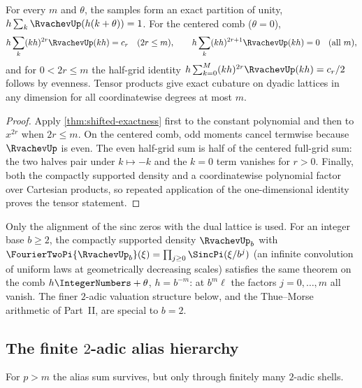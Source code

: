 \begin{corollary}
\label{cor:up-exact-specials}
For every $m$ and $\theta$, the samples form an exact partition of
unity, $h\sum_k\RvachevUp(h(k+\theta))=1$.  For the centered comb
($\theta=0$),
\begin{equation}
 h\sum_{k}(kh)^{2r}\RvachevUp(kh)=c_r\quad(2r\le m),
 \qquad
 h\sum_{k}(kh)^{2r+1}\RvachevUp(kh)=0\quad(\text{all }m),
 \label{eq:centered-moments}
\end{equation}
and for $0<2r\le m$ the half-grid identity
$h\sum_{k=0}^{M}(kh)^{2r}\RvachevUp(kh)=c_r/2$ follows by evenness.
Tensor products give exact cubature on dyadic lattices in any
dimension for all coordinatewise degrees at most $m$.
\end{corollary}

\begin{proof}
Apply \cref{thm:shifted-exactness} first to the constant polynomial and
then to $x^{2r}$ when $2r\le m$.  On the centered comb, odd moments
cancel termwise because $\RvachevUp$ is even.  The even half-grid sum is
half of the centered full-grid sum: the two halves pair under $k\mapsto-k$
and the $k=0$ term vanishes for $r>0$.  Finally, both the compactly
supported density and a coordinatewise polynomial factor over Cartesian
products, so repeated application of the one-dimensional identity proves
the tensor statement.
\end{proof}

\begin{remark}
\label{rem:base-b}
Only the alignment of the sinc zeros with the dual lattice is used.
For an integer base $b\ge2$, the compactly supported density $\RvachevUp_b$
with $\FourierTwoPi{\RvachevUp_b}(\xi)=\prod_{j\ge0}\SincPi(\xi/b^{j})$ (an
infinite convolution of uniform laws at geometrically decreasing
scales) satisfies the same theorem on the comb $h\IntegerNumbers+\theta$,
$h=b^{-m}$: at $b^{m}\ell$ the factors $j=0,\dots,m$ all vanish.  The
finer $2$-adic valuation structure below, and the Thue--Morse
arithmetic of Part~II, are special to $b=2$.
\end{remark}

\subsection{The finite \texorpdfstring{$2$}{2}-adic alias hierarchy}

For $p>m$ the alias sum survives, but only through finitely many
$2$-adic shells.

